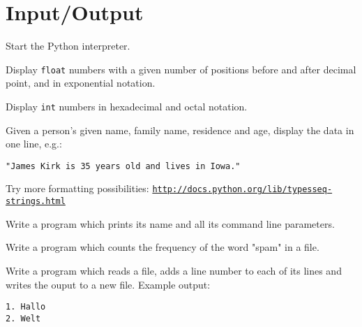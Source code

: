 \newpage

\section*{Input/Output}
\begin{aufgabe}
Start the Python interpreter.
\begin{auflistung}
\item Display \lstinline{float} numbers with a given number of positions before and after decimal point, and in exponential notation.
\item Display \lstinline{int} numbers in hexadecimal and octal notation.
\item Given a person's given name, family name, residence and age, display the data in one line, e.g.:
\begin{verbatim}
"James Kirk is 35 years old and lives in Iowa."
\end{verbatim}
\item Try more formatting possibilities: \texttt{\underline{http://docs.python.org/lib/typesseq-strings.html}}
\end{auflistung}
\end{aufgabe}

\begin{aufgabe}
Write a program which prints its name and all its command line parameters.
\end{aufgabe}

\begin{aufgabe}
Write a program which counts the frequency of the word "spam" in a file. 
\end{aufgabe}

\begin{aufgabe}
Write a program which reads a file, adds a line number to each of its lines and writes the ouput to a new file. Example output:
\begin{verbatim}
1. Hallo
2. Welt
\end{verbatim}

\end{aufgabe}


